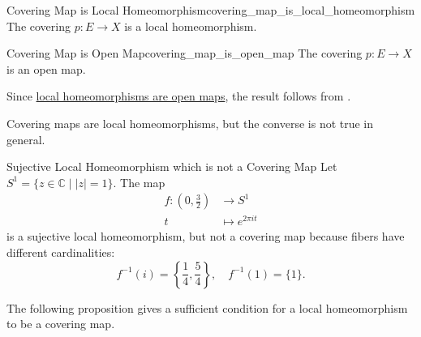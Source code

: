 \documentclass{report}
\begin{document}
\begin{proposition}{Covering Map is Local Homeomorphism}{covering_map_is_local_homeomorphism}
	The covering $p:E\to X$ is a local homeomorphism.
\end{proposition}

\begin{corollary}{Covering Map is Open Map}{covering_map_is_open_map}
	The covering $p:E\to X$ is an open map.
\end{corollary}
\begin{prf}
	Since \hyperref[th:equivalent_definition_of_local_homeomorphism]{local homeomorphisms are open maps}, the result follows from .
\end{prf}

\noindent Covering maps are local homeomorphisms, but the converse is not true in general.

\begin{example}{Sujective Local Homeomorphism which is not a Covering Map}{}
	Let $S^1=\{z\in\mathbb{C}\mid |z|=1\}$. The map
	\begin{align*}
		f:\left(0,\frac{3}{2}\right) & \longrightarrow S^1      \\
		t            & \longmapsto e^{2\pi i t}
	\end{align*}
	is a sujective local homeomorphism, but not a covering map because fibers have different cardinalities:
	\[ 
		f^{-1}(i)=\left\{\frac{1}{4},\frac{5}{4}\right\}, \quad f^{-1}(1)=\{1\}.
	\]
\end{example}

\noindent The following proposition gives a sufficient condition for a local homeomorphism to be a covering map.
\end{document}
